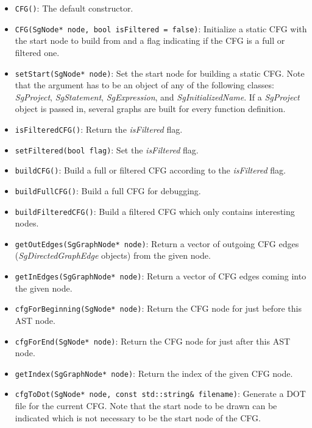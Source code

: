 \begin{itemize}
\item \lstinline{CFG()}: The default constructor. 
\item \lstinline{CFG(SgNode* node, bool isFiltered = false)}: Initialize a static CFG with the start 
node to build from and a flag indicating if the CFG is a full or filtered one.                                              
\item \lstinline{setStart(SgNode* node)}: Set the start node for building a static CFG. Note that the argument
has to be an object of any of the following classes: \textit{SgProject}, \textit{SgStatement}, \textit{SgExpression},
and \textit{SgInitializedName}. If a \textit{SgProject} object is passed in, several graphs are built for every
function definition. 
\item \lstinline{isFilteredCFG()}: Return the \textit{isFiltered} flag.
\item \lstinline{setFiltered(bool flag)}: Set the \textit{isFiltered} flag.                 
\item \lstinline{buildCFG()}: Build a full or filtered CFG according to the \textit{isFiltered} flag.
\item \lstinline{buildFullCFG()}: Build a full CFG for debugging.
\item \lstinline{buildFilteredCFG()}: Build a filtered CFG which only contains interesting nodes.
\item \lstinline{getOutEdges(SgGraphNode* node)}: Return a vector of outgoing CFG edges (\textit{SgDirectedGraphEdge} objects) from the given node.
\item \lstinline{getInEdges(SgGraphNode* node)}: Return a vector of CFG edges coming into the given node.
\item \lstinline{cfgForBeginning(SgNode* node)}: Return the CFG node for just before this AST node.                               
\item \lstinline{cfgForEnd(SgNode* node)}: Return the CFG node for just after this AST node.                               
\item \lstinline{getIndex(SgGraphNode* node)}: Return the index of the given CFG node.
\item \lstinline{cfgToDot(SgNode* node, const std::string& filename)}: Generate a DOT file for the current CFG. Note that the start node
to be drawn can be indicated which is not necessary to be the start node of the CFG.                                                      
\end{itemize}

